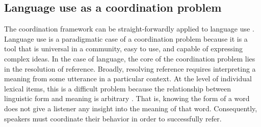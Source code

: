 \documentclass[man, noapacite, 12pt]{apa2}
\begin{document}
\subsection{Language use as a coordination problem}
The coordination  framework can be straight-forwardly applied to language use \cite{lewis1969convention}. Language use is a paradigmatic case of a coordination problem because it is a tool that is universal in a community, easy to use, and capable of expressing complex ideas. In the case of language, the core of the coordination problem lies in the resolution of reference. Broadly, resolving reference requires interpreting a meaning from some utterance in a particular context. At the level of individual lexical items, this is a difficult problem because the relationship between linguistic form and meaning is arbitrary \cite{saussure, hockett1960}. That is, knowing the form of a word does not give a listener any insight into the meaning of that word. Consequently, speakers must coordinate their behavior in order to successfully refer.

\end{document}
